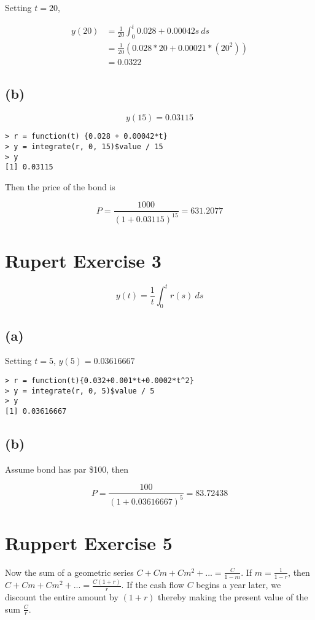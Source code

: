 \documentclass[11pt]{scrartcl}
\begin{document}
Setting $t=20$,

\begin{align*}
y(20) &= \frac{1}{20} \int_0^t 0.028 + 0.00042s \: ds \\
&=\frac{1}{20}(0.028*20 + 0.00021*(20^2)) \\
&=0.0322
\end{align*}

\subsection*{(b)}

\[y(15) = 0.03115\]

\begin{lstlisting}
> r = function(t) {0.028 + 0.00042*t}
> y = integrate(r, 0, 15)$value / 15
> y
[1] 0.03115
\end{lstlisting}

Then the price of the bond is 

\[P = \frac{1000}{(1+0.03115)^{15}} = 631.2077\]

\section*{Rupert Exercise 3}

\[y(t) = \frac{1}{t} \int_0^t r(s) \: ds\]

\subsection*{(a)}

Setting $t=5$, $y(5) = 0.03616667$

\begin{lstlisting}
> r = function(t){0.032+0.001*t+0.0002*t^2}
> y = integrate(r, 0, 5)$value / 5
> y
[1] 0.03616667
\end{lstlisting}

\subsection*{(b)}

Assume bond has par \$100, then

\[P = \frac{100}{(1+0.03616667)^5} = 83.72438\]

\section*{Ruppert Exercise 5}

Now the sum of a geometric series $C + Cm + Cm^2 + ... = \frac{C}{1-m}$. If $m = \frac{1}{1-r}$, then $C + Cm + Cm^2 + ... = \frac{C(1+r)}{r}$. If the cash flow $C$ begins a year later, we discount the entire amount by $(1+r)$ thereby making the present value of the sum $\frac{C}{r}$.
\end{document}
